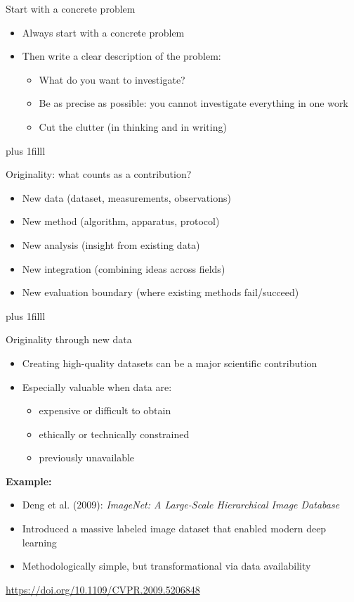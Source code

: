 \documentclass[aspectratio=169]{beamer}
\newcommand{\btVFill}{\vskip0pt plus 1filll}
\begin{document}
\begin{frame}{Start with a concrete problem}
  \begin{itemize}
    \item Always start with a concrete problem
    \item Then write a clear description of the problem:
      \begin{itemize}
        \item What do you want to investigate?
        \item Be as precise as possible: you cannot investigate everything in one work
        \item Cut the clutter (in thinking and in writing)
      \end{itemize}
  \end{itemize}
  \btVFill
\end{frame}

\begin{frame}{Originality: what counts as a contribution?}
  \begin{itemize}
    \item New data (dataset, measurements, observations)
    \item New method (algorithm, apparatus, protocol)
    \item New analysis (insight from existing data)
    \item New integration (combining ideas across fields)
    \item New evaluation boundary (where existing methods fail/succeed)
  \end{itemize}
    \btVFill
\end{frame}

\begin{frame}{Originality through new data}
  \begin{itemize}
    \item Creating high-quality datasets can be a major scientific contribution
    \item Especially valuable when data are:
      \begin{itemize}
        \item expensive or difficult to obtain
        \item ethically or technically constrained
        \item previously unavailable
      \end{itemize}
  \end{itemize}
  \vspace{0.5em}
  \textbf{Example:}
  \begin{itemize}
    \item Deng et al. (2009): \emph{ImageNet: A Large-Scale Hierarchical Image Database}
    \item Introduced a massive labeled image dataset that enabled modern deep learning
    \item Methodologically simple, but transformational via data availability
  \end{itemize}
  \vspace{0.3em}
  \tiny
  \url{https://doi.org/10.1109/CVPR.2009.5206848}
\end{frame}
\end{document}

